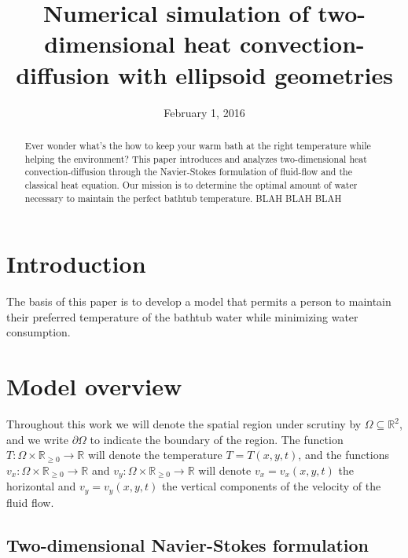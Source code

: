 \documentclass[12pt]{article}
\title{Numerical simulation of two-dimensional heat convection-diffusion with
ellipsoid geometries}
\date{February 1, 2016}
\newcommand{\R}{\mathbb{R}}
\begin{document}
\maketitle

\begin{abstract}
	Ever wonder what's the how to keep your warm bath at the right temperature while helping the environment? This paper introduces and analyzes two-dimensional heat convection-diffusion through the Navier-Stokes formulation of fluid-flow and the classical heat equation. Our mission is to determine the optimal amount of water necessary to maintain the perfect bathtub temperature. BLAH BLAH BLAH
\end{abstract}

\section{Introduction}

The basis of this paper is to develop a model that permits a person to maintain their preferred temperature of the bathtub water while minimizing water consumption.    

\section{Model overview}

Throughout this work we will denote the spatial region under scrutiny by
$\Omega \subseteq \R^2$, and we write $\partial \Omega$ to indicate the
boundary of the region. The function $T : \Omega \times \R_{\geq 0} \to \R$
will denote the temperature $T = T(x,y,t)$, and the functions $v_x : \Omega
\times \R_{\geq 0} \to \R$ and $v_y : \Omega \times \R_{\geq 0} \to \R$ will
denote $v_x = v_x(x,y,t)$ the horizontal and $v_y = v_y(x,y,t)$ the vertical
components of the velocity of the fluid flow. 

\subsection{Two-dimensional Navier-Stokes formulation}
\end{document}
